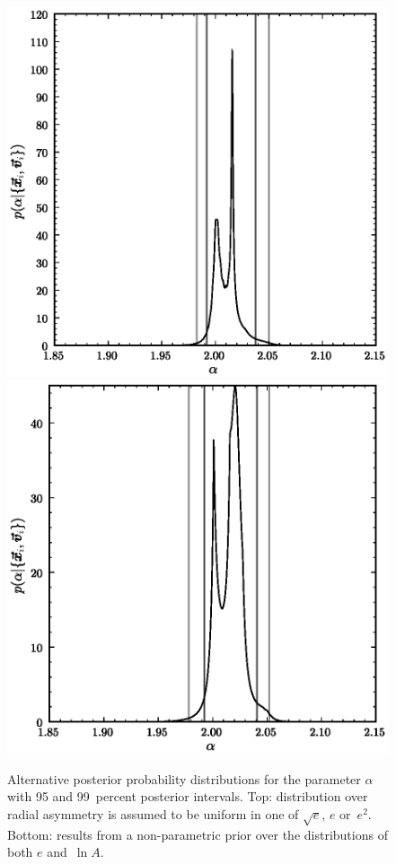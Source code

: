 \clearpage
\begin{figure}
\includegraphics[height=.4\textheight]{figs_solarsystem/alpha_posterior_3es_data6.ps}\\
\includegraphics[height=.4\textheight]{figs_solarsystem/alpha_posterior_mcmc_6_500000.ps}
\caption[Alternative posterior probability distributions for the
  parameter $\alpha$]{Alternative posterior probability distributions
  for the parameter $\alpha$ with 95 and 99~percent posterior
  intervals. Top: distribution over radial asymmetry is assumed to be
  uniform in one of $\sqrt{e}$, $e$ or~$e^2$. Bottom: results from a
  non-parametric prior over the distributions of both $e$ and~$\ln
  A$.}\label{fig:altBayes1d}
\end{figure}

